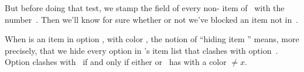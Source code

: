 But before doing that test, we stamp the  field of every
non- item of~ with the number~. Then we'll know for
sure
whether or not we've blocked an item not in~.

When  is an item in option , with color , the notion
of
``hiding item '' means, more precisely, that we hide every option
in 's item list that clashes with option~. Option  clashes with~
if and only if either  or ~has  with a
color $\ne x$.

